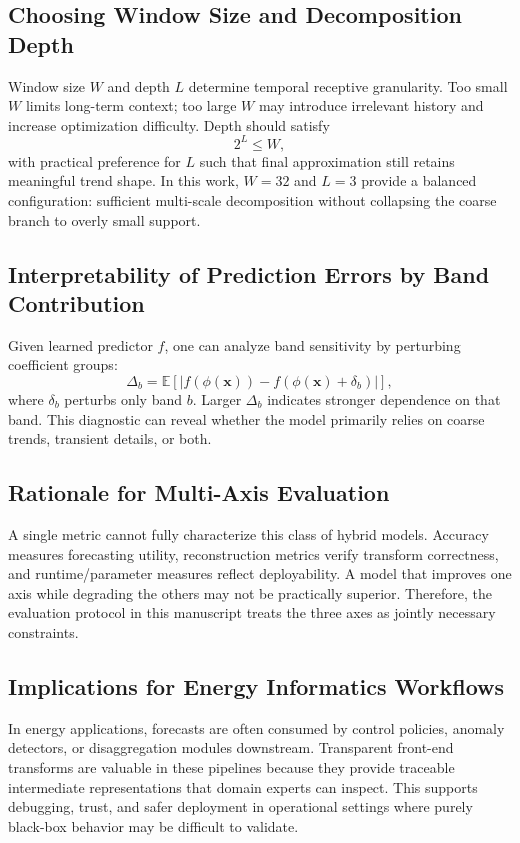 \documentclass[journal]{IEEEtran}
\begin{document}
\subsection{Choosing Window Size and Decomposition Depth}
Window size $W$ and depth $L$ determine temporal receptive granularity. Too small $W$ limits long-term context; too large $W$ may introduce irrelevant history and increase optimization difficulty. Depth should satisfy
\begin{equation}
2^L \leq W,
\end{equation}
with practical preference for $L$ such that final approximation still retains meaningful trend shape. In this work, $W=32$ and $L=3$ provide a balanced configuration: sufficient multi-scale decomposition without collapsing the coarse branch to overly small support.

\subsection{Interpretability of Prediction Errors by Band Contribution}
Given learned predictor $f$, one can analyze band sensitivity by perturbing coefficient groups:
\begin{equation}
\Delta_b = \mathbb{E}\left[\left|f(\phi(\mathbf{x}))-f(\phi(\mathbf{x})+\delta_b)\right|\right],
\end{equation}
where $\delta_b$ perturbs only band $b$. Larger $\Delta_b$ indicates stronger dependence on that band. This diagnostic can reveal whether the model primarily relies on coarse trends, transient details, or both.

\subsection{Rationale for Multi-Axis Evaluation}
A single metric cannot fully characterize this class of hybrid models. Accuracy measures forecasting utility, reconstruction metrics verify transform correctness, and runtime/parameter measures reflect deployability. A model that improves one axis while degrading the others may not be practically superior. Therefore, the evaluation protocol in this manuscript treats the three axes as jointly necessary constraints.

\subsection{Implications for Energy Informatics Workflows}
In energy applications, forecasts are often consumed by control policies, anomaly detectors, or disaggregation modules downstream. Transparent front-end transforms are valuable in these pipelines because they provide traceable intermediate representations that domain experts can inspect. This supports debugging, trust, and safer deployment in operational settings where purely black-box behavior may be difficult to validate.
\end{document}
